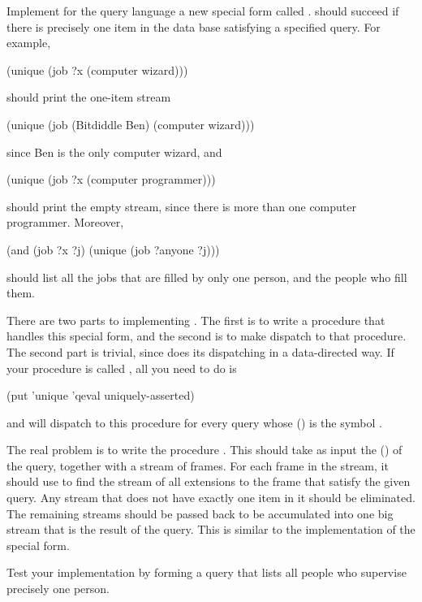\begin{exercise}
	\label{Exercise 4.75}
	Implement for the query language a new special form called .
	 should succeed if there is precisely one item in the data base satisfying a specified query.
	For example,
	\begin{scheme}
	  (unique (job ?x (computer wizard)))
	\end{scheme}
	should print the one-item stream
	\begin{scheme}
	  (unique (job (Bitdiddle Ben) (computer wizard)))
	\end{scheme}
	since Ben is the only computer wizard, and
	\begin{scheme}
	  (unique (job ?x (computer programmer)))
	\end{scheme}
	should print the empty stream, since there is more than one computer programmer.
	Moreover,
	\begin{scheme}
	  (and (job ?x ?j) (unique (job ?anyone ?j)))
	\end{scheme}
	should list all the jobs that are filled by only one person, and the people who fill them.

	There are two parts to implementing .
	The first is to write a procedure that handles this special form, and the second is to make  dispatch to that procedure.
	The second part is trivial, since  does its dispatching in a data-directed way.
	If your procedure is called , all you need to do is
	\begin{scheme}
	  (put 'unique 'qeval uniquely-asserted)
	\end{scheme}
	and  will dispatch to this procedure for every query whose  () is the symbol .

	The real problem is to write the procedure .
	This should take as input the  () of the  query, together with a stream of frames.
	For each frame in the stream, it should use  to find the stream of all extensions to the frame that satisfy the given query.
	Any stream that does not have exactly one item in it should be eliminated.
	The remaining streams should be passed back to be accumulated into one big stream that is the result of the  query.
	This is similar to the implementation of the  special form.

	Test your implementation by forming a query that lists all people who supervise precisely one person.
\end{exercise}




